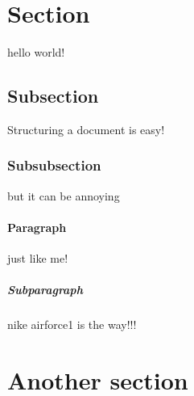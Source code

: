 \documentclass{article}
\begin{document}
	\section{Section}
	hello world!
	\subsection{Subsection}
	Structuring a document is easy!
	\subsubsection{Subsubsection}
	but it can be annoying
	\paragraph{Paragraph}
	just like me!
	\subparagraph{Subparagraph}
	nike airforce1 is the way!!!
	\section{Another section}
\end{document}

